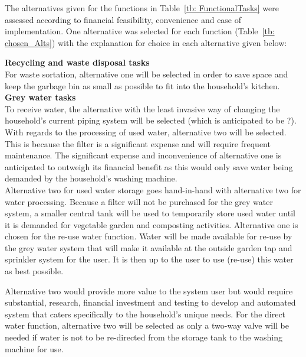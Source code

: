 \documentclass[a4paper,11pt,fleqn]{report}
\begin{document}
The alternatives given for the functions in Table~\ref{tb: FunctionalTasks} were assessed according to financial feasibility, convenience and ease of implementation. One alternative was selected for each function (Table~\ref{tb: chosen_Alts}) with the explanation for choice in each alternative given below:

\textbf{Recycling and waste disposal tasks}\\
For waste sortation, alternative one will be selected in order to save space and keep the garbage bin as small as possible to fit into the household's kitchen.\\

\textbf{Grey water tasks}\\
To receive water, the alternative with the least invasive way of changing the household's current piping system will be selected (which is anticipated to be ?). With regards to the processing of used water, alternative two will be selected. This is because the filter is a significant expense and will require frequent maintenance. The significant expense and inconvenience of alternative one is anticipated to outweigh its financial benefit as this would only save water being demanded by the household's washing machine.\\

Alternative two for used water storage goes hand-in-hand with alternative two for water processing. Because a filter will not be purchased for the grey water system, a smaller central tank will be used to temporarily store used water until it is demanded for vegetable garden and composting activities. Alternative one is chosen for the re-use water function. Water will be made available for re-use by the grey water system that will make it available at the outside garden tap and sprinkler system for the user. It is then up to the user to use (re-use) this water as best possible.

Alternative two would provide more value to the system user but would require substantial, research, financial investment and testing to develop and automated system that caters specifically to the household's unique needs. For the direct water function, alternative two will be selected as only a two-way valve will be needed if water is not to be re-directed from the storage tank to the washing machine for use.\\
\end{document}
